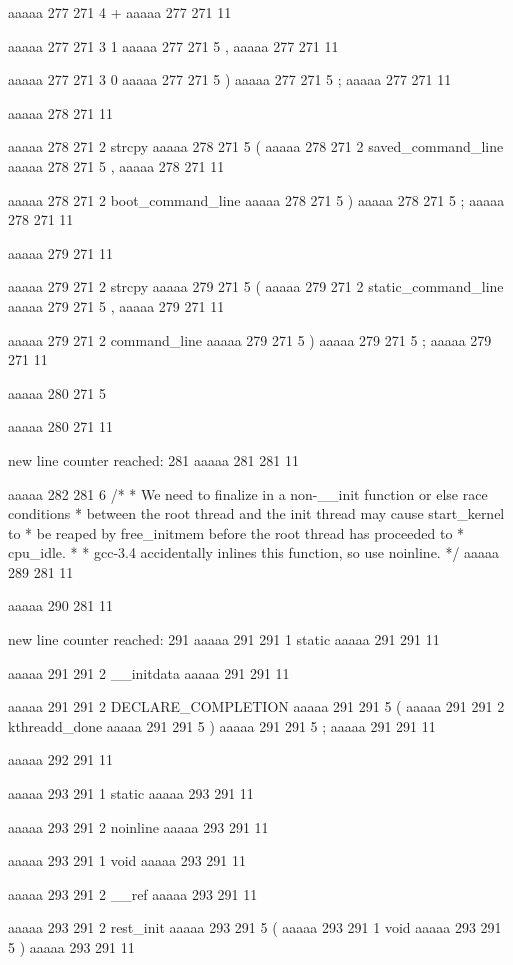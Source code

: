 {aaaaa 277 271
4
+
aaaaa 277 271
11
 
aaaaa 277 271
3
1
aaaaa 277 271
5
,
aaaaa 277 271
11
 
aaaaa 277 271
3
0
aaaaa 277 271
5
)
aaaaa 277 271
5
;
aaaaa 277 271
11


aaaaa 278 271
11
	
aaaaa 278 271
2
strcpy
aaaaa 278 271
5
(
aaaaa 278 271
2
saved_command_line
aaaaa 278 271
5
,
aaaaa 278 271
11
 
aaaaa 278 271
2
boot_command_line
aaaaa 278 271
5
)
aaaaa 278 271
5
;
aaaaa 278 271
11


aaaaa 279 271
11
	
aaaaa 279 271
2
strcpy
aaaaa 279 271
5
(
aaaaa 279 271
2
static_command_line
aaaaa 279 271
5
,
aaaaa 279 271
11
 
aaaaa 279 271
2
command_line
aaaaa 279 271
5
)
aaaaa 279 271
5
;
aaaaa 279 271
11


aaaaa 280 271
5
}
aaaaa 280 271
11


new line counter reached: 281
aaaaa 281 281
11


aaaaa 282 281
6
/*
 * We need to finalize in a non-__init function or else race conditions
 * between the root thread and the init thread may cause start_kernel to
 * be reaped by free_initmem before the root thread has proceeded to
 * cpu_idle.
 *
 * gcc-3.4 accidentally inlines this function, so use noinline.
 */
aaaaa 289 281
11


aaaaa 290 281
11


new line counter reached: 291
aaaaa 291 291
1
static
aaaaa 291 291
11
 
aaaaa 291 291
2
__initdata
aaaaa 291 291
11
 
aaaaa 291 291
2
DECLARE_COMPLETION
aaaaa 291 291
5
(
aaaaa 291 291
2
kthreadd_done
aaaaa 291 291
5
)
aaaaa 291 291
5
;
aaaaa 291 291
11


aaaaa 292 291
11


aaaaa 293 291
1
static
aaaaa 293 291
11
 
aaaaa 293 291
2
noinline
aaaaa 293 291
11
 
aaaaa 293 291
1
void
aaaaa 293 291
11
 
aaaaa 293 291
2
__ref
aaaaa 293 291
11
 
aaaaa 293 291
2
rest_init
aaaaa 293 291
5
(
aaaaa 293 291
1
void
aaaaa 293 291
5
)
aaaaa 293 291
11


